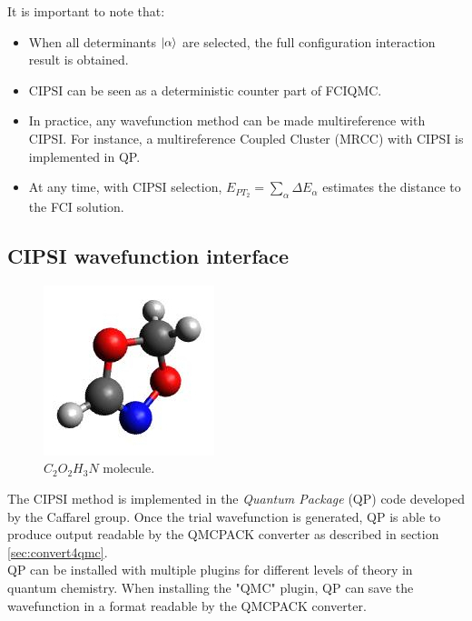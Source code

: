 It is important to note that:
\begin{itemize}
\item When all determinants $\ket{\alpha}$ are selected, the full configuration interaction result is obtained.\\
\item CIPSI can be seen as a deterministic counter part of FCIQMC. \\
\item In practice, any wavefunction method can be made multireference with CIPSI. For instance, a multireference Coupled Cluster (MRCC) with CIPSI is implemented in QP.\cite{Garniron2017-1}\\
\item At any time, with CIPSI selection, $E_{PT_2}=\sum_\alpha \Delta E_\alpha$ estimates the distance to the FCI solution.
\end{itemize}


\subsection{CIPSI wavefunction interface}
\label{sec:cipsi}


\begin{figure}
\begin{center}
\includegraphics[trim = 0mm 0mm 0mm 0mm, clip,width=0.3\columnwidth]{figures/Reactant.jpg}
\end{center}
\caption{$C_2O_2H_3N$ molecule.
\label{fig:C2O2H3N}
}
\end{figure}
The CIPSI method
is implemented in the \textit{Quantum Package} (QP) code\cite{QP} developed by the Caffarel group. Once the trial wavefunction is generated, QP is able to produce output readable by the QMCPACK converter as described in section \ref{sec:convert4qmc}.\\
QP can be installed with multiple plugins for different levels of theory in quantum chemistry. When installing the "QMC" plugin, QP can save the wavefunction in a format readable by the QMCPACK converter. \\

